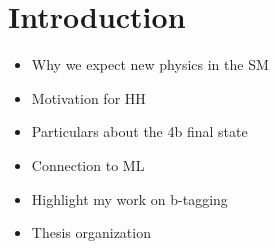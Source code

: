 \chapter{Introduction}

\begin{itemize}
	\item Why we expect new physics in the SM
	\item Motivation for HH
	\item Particulars about the 4b final state
	\item Connection to ML
	\item Highlight my work on b-tagging
	\item Thesis organization
\end{itemize}